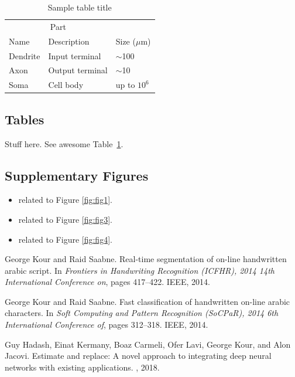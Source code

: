 \documentclass{article}
\begin{document}
\begin{table}
 \caption{Sample table title}
  \centering
  \begin{tabular}{lll}
    \toprule
    \multicolumn{2}{c}{Part}                   \\
    \cmidrule(r){1-2}
    Name     & Description     & Size ($\mu$m) \\
    \midrule
    Dendrite & Input terminal  & $\sim$100     \\
    Axon     & Output terminal & $\sim$10      \\
    Soma     & Cell body       & up to $10^6$  \\
    \bottomrule
  \end{tabular}
  \label{tab:table}
\end{table}


\subsection{Tables}
Stuff here.
See awesome Table~\ref{tab:table}.

\subsection{Supplementary Figures}
\begin{itemize}
\item related to Figure \ref{fig:fig1}.
\item related to Figure \ref{fig:fig3}.
\item related to Figure \ref{fig:fig4}.
\end{itemize}


  


\begin{thebibliography}{1}

George Kour and Raid Saabne.
\newblock Real-time segmentation of on-line handwritten arabic script.
\newblock In {\em Frontiers in Handwriting Recognition (ICFHR), 2014 14th
  International Conference on}, pages 417--422. IEEE, 2014.

George Kour and Raid Saabne.
\newblock Fast classification of handwritten on-line arabic characters.
\newblock In {\em Soft Computing and Pattern Recognition (SoCPaR), 2014 6th
  International Conference of}, pages 312--318. IEEE, 2014.

Guy Hadash, Einat Kermany, Boaz Carmeli, Ofer Lavi, George Kour, and Alon
  Jacovi.
\newblock Estimate and replace: A novel approach to integrating deep neural
  networks with existing applications.
, 2018.

\end{thebibliography}
\end{document}
